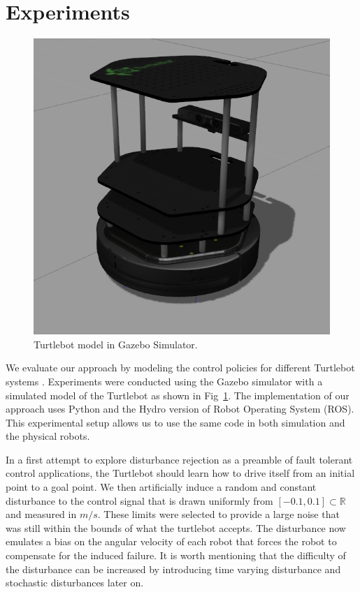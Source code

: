 \documentclass{aamas2016}
\renewcommand{\Re}{\mathbb{R}}
\begin{document}
\section{Experiments} \label{Experiments}

\begin{figure}[!htbp]
    \centering
        \includegraphics[width=.45\textwidth]{images/turtlebotsim_crop.png}
        \caption{Turtlebot model in Gazebo Simulator.}\label{fig:gazebo}
\end{figure}

We evaluate our approach by modeling the control policies for different Turtlebot systems \cite{Turtlebot-2016}. 
Experiments were conducted using the Gazebo simulator \cite{Gazebo-2016,ROS-2016} with a simulated model of the Turtlebot as shown in Fig~\ref{fig:gazebo}. 
The implementation of our approach uses Python and the Hydro version of Robot Operating System (ROS).
This experimental setup allows us to use the same code in both simulation and the physical robots.

In a first attempt to explore disturbance rejection as a preamble of
fault tolerant control applications, the Turtlebot should learn how to drive itself from an initial point to a goal point.
We then artificially induce a random and constant disturbance to the control signal that is drawn uniformly from 
$[-0.1, 0.1] \subset \Re$ and measured in $m/s$. These limits were selected to provide a large noise that was still within the bounds of what the turtlebot accepts.
The disturbance now emulates a bias on the angular velocity of each robot that forces the robot to
compensate for the induced failure. It is worth mentioning that the difficulty of the disturbance can be increased by introducing
time varying disturbance and stochastic disturbances later on.
\end{document}
